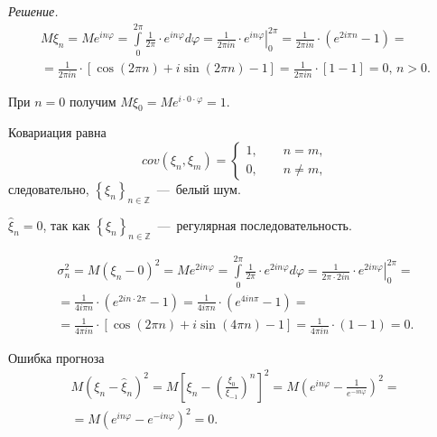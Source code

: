 \textit{Решение.}
\begin{gather*}
  M \xi_n =
  Me^{in \varphi } =
  \int \limits_0^{2 \pi } \frac{1}{2 \pi } \cdot e^{in \varphi } d \varphi =
  \left. \frac{1}{2 \pi in} \cdot e^{in \varphi} \right|_0^{2 \pi } =
  \frac{1}{2 \pi in} \cdot \left( e^{2i \pi n} - 1 \right) = \\
  = \frac{1}{2 \pi in} \cdot
  \left[ \cos \left( 2 \pi n \right) + i \sin \left( 2 \pi n \right) - 1 \right] =
  \frac{1}{2 \pi in} \cdot \left[ 1 - 1 \right] =
  0, \,
  n > 0.
\end{gather*}

При $n = 0$ получим $M \xi_0 = Me^{i \cdot 0 \cdot \varphi } = 1$.

Ковариация равна
\begin{equation*}
  cov \left( \xi_n, \xi_m \right) =
  \begin{cases}
    1, \qquad n = m, \\
    0, \qquad n \neq m,
  \end{cases}
\end{equation*}
следовательно, $ \left\{ \xi_n \right\}_{n \in \mathbb{Z}}$~---~белый шум.

$ \hat{ \xi }_n = 0$,
так как $ \left\{ \xi_n \right\}_{n \in \mathbb{Z}}$~---~регулярная последовательность.

\begin{gather*}
  \sigma_n^2 =
  M \left( \xi_n - 0 \right)^2 =
  Me^{2in \varphi } =
  \int \limits_0^{2 \pi } \frac{1}{2 \pi } \cdot e^{2in \varphi } d \varphi =
  \left. \frac{1}{2 \pi \cdot 2in} \cdot e^{2in \varphi } \right|_0^{2 \pi } = \\
  = \frac{1}{4i \pi n} \cdot \left( e^{2in \cdot 2 \pi } - 1 \right) =
  \frac{1}{4i \pi n} \cdot \left( e^{4in \pi } - 1 \right) = \\
  = \frac{1}{4 \pi in} \cdot \left[
    \cos \left( 2 \pi n \right) + i \sin \left( 4 \pi n \right) - 1
  \right] =
  \frac{1}{4 \pi in} \cdot \left( 1 - 1 \right) =
  0.
\end{gather*}

Ошибка прогноза
\begin{gather*}
  M \left( \xi_n - \hat{ \xi }_n \right)^2 =
  M \left[ \xi_n - \left( \frac{ \xi_0}{ \xi_{-1}} \right)^n \right]^2 =
  M \left( e^{in \varphi } - \frac{1}{e^{-in \varphi}} \right)^2 = \\
  = M \left( e^{in \varphi } - e^{-in \varphi } \right)^2 =
  0.
\end{gather*}

